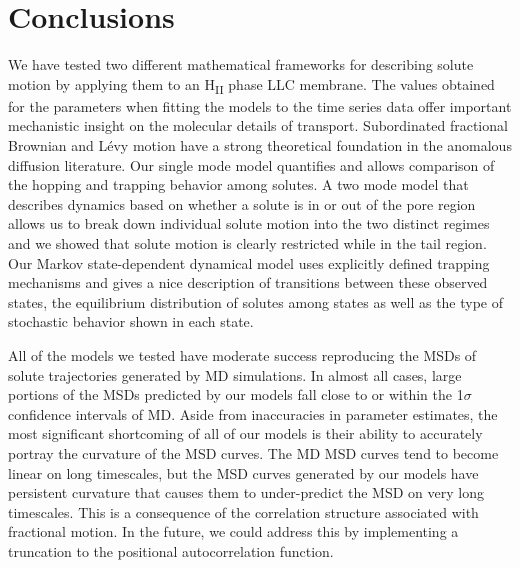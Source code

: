 \documentclass{article}
\begin{document}

  \section{Conclusions}
  
  We have tested two different mathematical frameworks for describing solute
  motion by applying them to an H\textsubscript{II} phase LLC membrane. The values
  obtained for the parameters when fitting the models to the time series data 
  offer important mechanistic insight on the molecular details of transport.
  Subordinated fractional Brownian and L\'evy motion have a 
  strong theoretical 
  foundation in the anomalous diffusion literature. Our single mode model
  quantifies and allows comparison of the hopping and trapping behavior 
  among solutes. A two mode model that describes dynamics based on whether
  a solute is in or out of the pore region allows us to break down individual
  solute motion into the two distinct regimes and we showed that solute motion is
  clearly restricted while in the tail region. Our Markov state-dependent dynamical
  model uses explicitly defined trapping mechanisms and gives a nice description 
  of transitions between these observed states, the equilibrium distribution of 
  solutes among states as well as the type of stochastic behavior shown in each 
  state. 
  
  All of the models we tested have moderate success reproducing the MSDs of
  solute trajectories generated by MD simulations. In almost all cases, large 
  portions of the MSDs predicted by our models fall close to or within the 1$\sigma$
  confidence intervals of MD. Aside from inaccuracies in parameter estimates,
  the most significant shortcoming of all of our models is their ability to 
  accurately portray the curvature of the MSD curves. The MD MSD curves tend to 
  become linear on long timescales, but the MSD curves generated by our models
  have persistent curvature that causes them to under-predict the MSD on very
  long timescales. This is a consequence of the correlation structure associated
  with fractional motion. In the future, we could address this by 
  implementing a truncation to the positional autocorrelation function.
  
\end{document}
